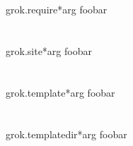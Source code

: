     \section{}

        \begin{funcdesc}{grok.require}{*arg}
        foobar
        \end{funcdesc}

    \section{}

        \begin{funcdesc}{grok.site}{*arg}
        foobar
        \end{funcdesc}

    \section{}

        \begin{funcdesc}{grok.template}{*arg}
        foobar
        \end{funcdesc}

    \section{}

        \begin{funcdesc}{grok.templatedir}{*arg}
        foobar
        \end{funcdesc}
